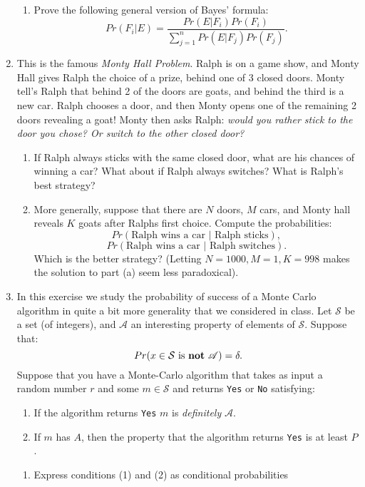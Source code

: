 \documentclass[11pt]{article}
\newcommand{\cS}{\mathcal{S}}
\newcommand{\sA}{\mathscr{A}}
\begin{document}
\begin{enumerate}
{\begin{enumerate}
{    }
    \item{
    Prove the following general version of Bayes' formula:
    \[Pr(F_i|E) = \frac{Pr(E|F_i)Pr(F_i)}{\sum_{j=1}^n Pr(E|F_j)Pr(F_j)}.\]
    }
  \end{enumerate}
  }
  \item{
  This is the famous \textit{Monty Hall Problem}.  Ralph is on a game show, and Monty Hall gives Ralph the choice of a prize, behind one of 3 closed doors.  Monty tell's Ralph that behind 2 of the doors are goats, and behind the third is a new car.  Ralph chooses a door, and then Monty opens one of the remaining 2 doors revealing a goat!  Monty then asks Ralph: \textit{would you rather stick to the door you chose?  Or switch to the other closed door?}
  \begin{enumerate}
    \item{
    If Ralph always sticks with the same closed door, what are his chances of winning a car?  What about if Ralph always switches?  What is Ralph's best strategy?
    }
    \item{
    More generally, suppose that there are $N$ doors, $M$ cars, and Monty hall reveals $K$ goats after Ralphs first choice.  Compute the probabilities:
    \[Pr(\text{Ralph wins a car }|\text{ Ralph sticks}),\]
    \[Pr(\text{Ralph wins a car }|\text{ Ralph switches}).\]
    Which is the better strategy? (Letting $N=1000, M=1, K=998$ makes the solution to part (a) seem less paradoxical).
    }
  \end{enumerate}
  }
  \item{
  In this exercise we study the probability of success of a Monte Carlo algorithm in quite a bit more generality that we considered in class.  Let $\cS$ be a set (of integers), and $\sA$ an interesting property of elements of $\cS$.  Suppose that:
  \[Pr(x\in\cS\text{ is \textbf{not} }\sA) = \delta.\]
  Suppose that you have a Monte-Carlo algorithm that takes as input a random number $r$ and some $m\in\cS$ and returns \verb|Yes| or \verb|No| satisfying:
  \begin{enumerate}[(1)]
    \item{If the algorithm returns \verb|Yes| $m$ is \textit{definitely} $\sA$.}
    \item{If $m$ has $A$, then the property that the algorithm returns \verb|Yes| is at least $P$.}
  \end{enumerate}
  \begin{enumerate}
    \item{Express conditions (1) and (2) as conditional probabilities}

\end{enumerate}}
\end{enumerate}
\end{document}
